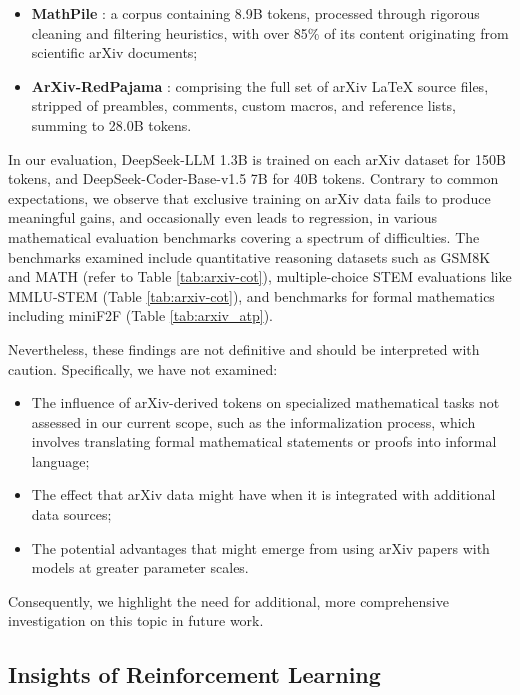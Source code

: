 \begin{itemize}[topsep=0pt]
    \item \textbf{MathPile} \citep{mathpile}: a corpus containing 8.9B tokens, processed through rigorous cleaning and filtering heuristics, with over 85\% of its content originating from scientific arXiv documents;
    \item \textbf{ArXiv-RedPajama} \citep{redpajama}: comprising the full set of arXiv LaTeX source files, stripped of preambles, comments, custom macros, and reference lists, summing to 28.0B tokens.
\end{itemize}

In our evaluation, DeepSeek-LLM 1.3B is trained on each arXiv dataset for 150B tokens, and DeepSeek-Coder-Base-v1.5 7B for 40B tokens. Contrary to common expectations, we observe that exclusive training on arXiv data fails to produce meaningful gains, and occasionally even leads to regression, in various mathematical evaluation benchmarks covering a spectrum of difficulties. The benchmarks examined include quantitative reasoning datasets such as GSM8K and MATH (refer to Table \ref{tab:arxiv-cot}), multiple-choice STEM evaluations like MMLU-STEM (Table \ref{tab:arxiv-cot}), and benchmarks for formal mathematics including miniF2F (Table \ref{tab:arxiv_atp}).

Nevertheless, these findings are not definitive and should be interpreted with caution. Specifically, we have not examined:

\begin{itemize}[topsep=0pt]
    \item The influence of arXiv-derived tokens on specialized mathematical tasks not assessed in our current scope, such as the informalization process, which involves translating formal mathematical statements or proofs into informal language;
    \item The effect that arXiv data might have when it is integrated with additional data sources;
    \item The potential advantages that might emerge from using arXiv papers with models at greater parameter scales.
\end{itemize}

Consequently, we highlight the need for additional, more comprehensive investigation on this topic in future work.

\subsection{Insights of Reinforcement Learning}
